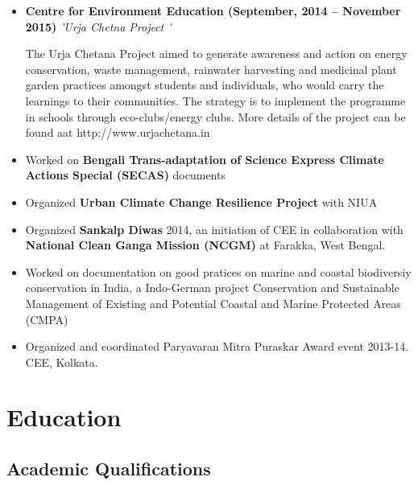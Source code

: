 \documentclass[11pt,a4paper,sans]{moderncv}
\begin{document}
\vspace{5pt}

\begin{itemize}
\item{\textbf{Centre for Environment Education (September, 2014 – November 2015)} \textit{'Urja Chetna Project '}

\vspace{3pt}

\small{ The Urja Chetana Project aimed to generate awareness and action on energy conservation, waste management, rainwater harvesting and medicinal
plant garden practices amongst students and individuals, who would carry the learnings to their communities.
The strategy is to implement the programme in schools through eco-clubs/energy clubs.
More details of the project can be found aat http://www.urjachetana.in }}

\vspace{3pt}
\item Worked on \textbf{Bengali Trans-adaptation of Science Express Climate Actions Special (SECAS)} documents
\item Organized \textbf{Urban Climate Change Resilience Project} with NIUA
\item Organized \textbf{Sankalp Diwas} 2014, an initiation of CEE in collaboration with \textbf{National Clean Ganga Mission (NCGM)} at Farakka, West Bengal.
\item Worked on documentation on good pratices on marine and coastal biodiversiy conservation in India, a Indo-German project Conservation and Sustainable Management of Existing and
Potential Coastal and Marine Protected Areas (CMPA)
\item Organized and coordinated Paryavaran Mitra Puraskar Award event 2013-14. CEE, Kolkata.
\end{itemize}
    \newpage
\section{Education}

\vspace{5pt}
\subsection{Academic Qualifications}

\vspace{5pt}
\end{document}
